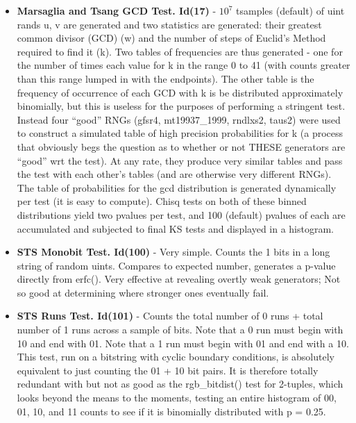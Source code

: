 \begin{itemize}
   \item \textbf{Marsaglia and Tsang GCD Test. Id(17)} - $10^7$ tsamples (default) of uint rands u, v are generated and two statistics are generated: their greatest common divisor (GCD) (w) and the number of steps of Euclid's Method required to find it (k). Two tables of frequencies are thus generated - one for the number of times each value for k in the range 0 to 41 (with counts greater than this range lumped in with the endpoints). The other table is the frequency of occurrence of each GCD with k is be distributed approximately binomially, but this is useless for the purposes of performing a stringent test.  Instead four ``good'' RNGs (gfsr4, mt19937\_1999, rndlxs2, taus2) were used to construct a simulated table of high precision probabilities for k (a process that obviously begs the question as to whether or not THESE generators are ``good'' wrt the test). At any rate, they produce very similar tables and pass the test with each other's tables (and are otherwise very different RNGs).  The table of probabilities for the gcd distribution is generated dynamically per test (it is easy to compute).  Chisq tests on both of these binned distributions yield two p\-values per test, and 100 (default) p\-values of each are accumulated and subjected to final KS tests and displayed in a histogram.
   
   \item \textbf{STS Monobit Test. Id(100)} - Very simple. Counts the 1 bits in a long string of random uints. Compares to expected number, generates a p-value directly from erfc().  Very effective at revealing overtly weak generators; Not so good at determining where stronger ones eventually fail.
   
   \item \textbf{STS Runs Test. Id(101)} - Counts the total number of 0 runs + total number of 1 runs across a sample of bits.  Note that a 0 run must begin with 10 and end with 01.  Note that a 1 run must begin with 01 and end with a 10. This test, run on a bitstring with cyclic boundary conditions, is absolutely equivalent to just counting the 01 + 10 bit pairs. It is therefore totally redundant with but not as good as the rgb\_bitdist() test for 2-tuples, which looks beyond the means to the moments, testing an entire histogram  of 00, 01, 10, and 11 counts to see if it is binomially distributed with p = 0.25.
   

\end{itemize}
